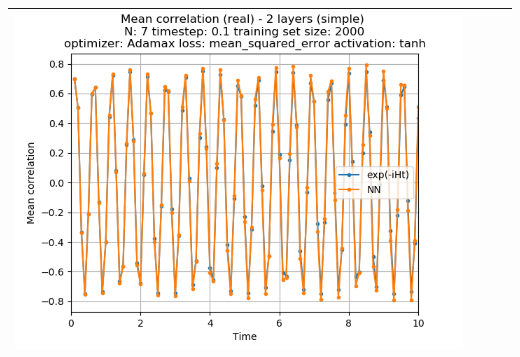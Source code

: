 \documentclass{article}
\begin{document}
\begin{tabular}{|c|c|c|c|}
     \includegraphics[scale=0.37]{./Searching_for_good_train_set_size/2_layers_simple_train_samples=2000_timestep=0.1_t_total=10.0_optimizer=Adamax_loss=mean_squared_error_activation=tanh/Corr_N=7_(real).png} \\ \hline


\end{tabular}
\end{document}
